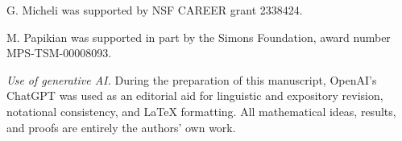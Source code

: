 \documentclass[10pt,a4paper]{amsart}
\theoremstyle{definition}
\theoremstyle{plain}
\theoremstyle{remark}
\begin{document}
\noindent G. Micheli was supported by NSF CAREER grant 2338424.

\noindent M. Papikian was supported in part by the Simons Foundation,
award number MPS-TSM-00008093.

\medskip

\noindent\emph{Use of generative AI.}
During the preparation of this manuscript, OpenAI's ChatGPT was used as an
editorial aid for linguistic and expository revision, notational consistency,
and LaTeX formatting. All mathematical ideas, results, and proofs are entirely
the authors' own work.



\end{document}
